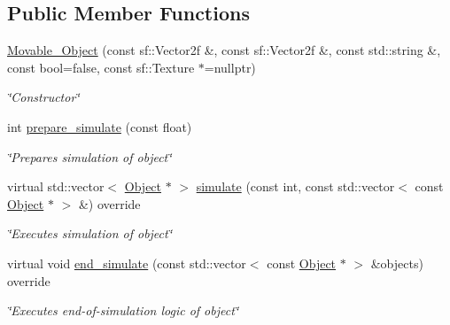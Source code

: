 \subsection*{Public Member Functions}
\begin{DoxyCompactItemize}
\item 
\hyperlink{classMovable__Object_a7ef80ffc751a380e9c0beb7d4f0da9ce}{Movable\+\_\+\+Object} (const sf\+::\+Vector2f \&, const sf\+::\+Vector2f \&, const std\+::string \&, const bool=false, const sf\+::\+Texture $\ast$=nullptr)
\begin{DoxyCompactList}\small\item\em \char`\"{}\+Constructor\char`\"{} \end{DoxyCompactList}\item 
int \hyperlink{classMovable__Object_aed1d50e30dc96faea3250bee8b4af227}{prepare\+\_\+simulate} (const float)
\begin{DoxyCompactList}\small\item\em \char`\"{}\+Prepares simulation of object\char`\"{} \end{DoxyCompactList}\item 
virtual std\+::vector$<$ \hyperlink{classObject}{Object} $\ast$ $>$ \hyperlink{classMovable__Object_ac267e0c945b558b0cf533d7fbe5ee7c3}{simulate} (const int, const std\+::vector$<$ const \hyperlink{classObject}{Object} $\ast$ $>$ \&) override
\begin{DoxyCompactList}\small\item\em \char`\"{}\+Executes simulation of object\char`\"{} \end{DoxyCompactList}\item 
virtual void \hyperlink{classMovable__Object_ac9111a729082cd46a913e1877a57a930}{end\+\_\+simulate} (const std\+::vector$<$ const \hyperlink{classObject}{Object} $\ast$ $>$ \&objects) override
\begin{DoxyCompactList}\small\item\em \char`\"{}\+Executes end-\/of-\/simulation logic of object\char`\"{} \end{DoxyCompactList}\end{DoxyCompactItemize}
